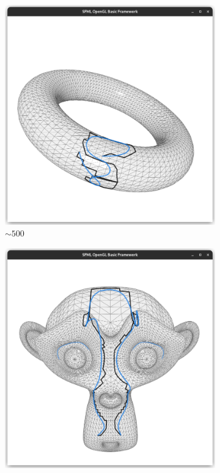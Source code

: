 \documentclass{stdlocal}
\begin{document}
\begin{figure}
  \centering
  \begin{subfigure}[b]{0.24\linewidth}
    \centering
    \includegraphics[width=\linewidth,trim={15px 20 15 50},clip]{images/torus-smooth-1.png}
    \caption{$\sim 500$}
  \end{subfigure}
  \begin{subfigure}[b]{0.24\linewidth}
    \centering
    \includegraphics[width=\linewidth,trim={15px 20 15 50},clip]{images/suzanne-smooth-1.png}

\end{subfigure}
\end{figure}
\end{document}
